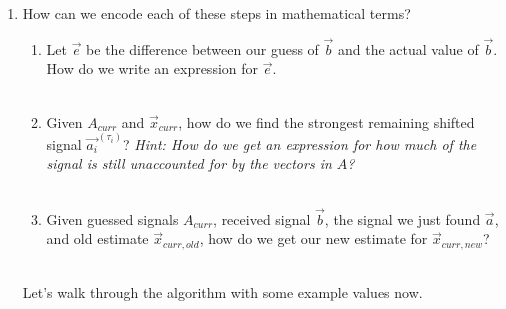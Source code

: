 \begin{enumerate}
    \item How can we encode each of these steps in mathematical terms?
    \begin{enumerate}
        \item Let $\vec{e}$ be the difference between our guess of $\vec{b}$ and the actual value of $\vec{b}$.
        How do we write an expression for $\vec{e}$.
        \\ \\
        \item Given $A_{curr}$ and $\vec{x}_{curr}$, how do we find the strongest remaining shifted signal $\vec{a_i}^{(\tau_i)}$?
        \textit{Hint: How do we get an expression for how much of the signal is still unaccounted for by the vectors in $A$?}
        \\ \\
        \item Given guessed signals $A_{curr}$, received signal $\vec{b}$, the signal we just found $\vec{a}$, and old estimate
        $\vec{x}_{curr, old}$, how do we get our new estimate for $\vec{x}_{curr, new}$?
        \\ \\
    \end{enumerate}
    Let's walk through the algorithm with some example values now.

\end{enumerate}